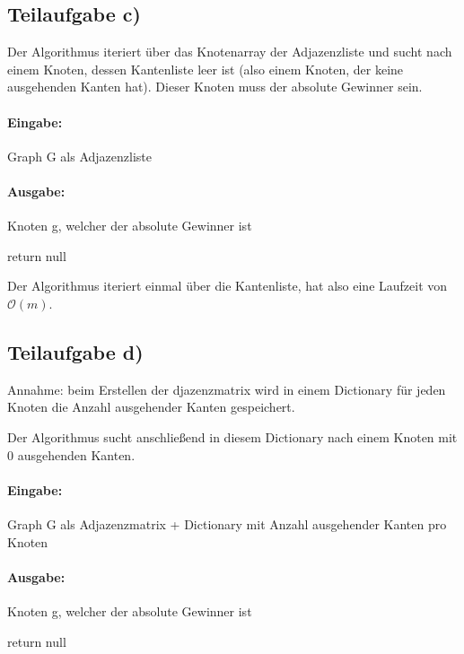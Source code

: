 \documentclass[12pt]{scrartcl}%
\theoremstyle{nonumberplain}
\newcommand{\bO}[1]{\mathcal O(#1)}
\begin{document}
\subsection*{Teilaufgabe c)}

Der Algorithmus iteriert über das Knotenarray der Adjazenzliste und sucht nach einem Knoten, dessen Kantenliste leer ist (also einem Knoten, der keine ausgehenden Kanten hat). Dieser Knoten muss der absolute Gewinner sein.

\paragraph{Eingabe:} Graph G als Adjazenzliste

\paragraph{Ausgabe:} Knoten g, welcher der absolute Gewinner ist

\begin{algorithm}
	 {
	}
	return null\;
\end{algorithm}

Der Algorithmus iteriert einmal über die Kantenliste, hat also eine Laufzeit von $\bO{m}$.

\subsection*{Teilaufgabe d)}

Annahme: beim Erstellen der djazenzmatrix wird in einem Dictionary für jeden Knoten die Anzahl ausgehender Kanten gespeichert. 

Der Algorithmus sucht anschließend in diesem Dictionary nach einem Knoten mit 0 ausgehenden Kanten.

\paragraph{Eingabe:} Graph G als Adjazenzmatrix + Dictionary mit Anzahl ausgehender Kanten pro Knoten

\paragraph{Ausgabe:} Knoten g, welcher der absolute Gewinner ist

\begin{algorithm}
	 {
	}
	return null\;
\end{algorithm}
\end{document}
